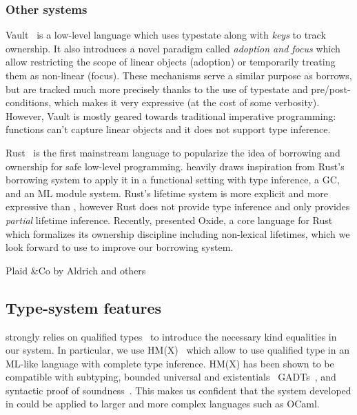 \subsubsection{Other systems}

Vault~\citep{DBLP:conf/pldi/DeLineF01}
is a low-level language which uses typestate along with \emph{keys}
to track ownership. It also introduces a novel paradigm
called \emph{adoption and focus} \citep{DBLP:conf/pldi/FahndrichD02}
which allow restricting the scope of linear objects
(adoption) or temporarily treating them as non-linear (focus).
These mechanisms serve a similar purpose as borrows, but are tracked
much more precisely thanks to the use of typestate and pre/post-conditions,
which makes it very expressive (at the cost of some verbosity).
However, Vault is mostly geared towards traditional imperative programming:
functions can't capture linear objects and it does not support
type inference.

Rust~\citep{rust} is the first
mainstream language to popularize the idea of borrowing and ownership
for safe low-level programming.
\lang heavily draws inspiration from Rust's borrowing system to apply
it in a functional setting with type inference, a GC, and
an ML module system.
Rust's lifetime system is more explicit and more expressive than \lang,
however Rust does not provide type inference
and only provides \emph{partial} lifetime inference.
Recently, \citet{DBLP:journals/corr/abs-1903-00982} presented Oxide,
a core language for Rust which formalizes its ownership discipline
including non-lexical lifetimes, which we look forward to use to improve
our borrowing system.

Plaid \&Co by Aldrich and others

\subsection{Type-system features}

\lang strongly relies on qualified types~\cite{DBLP:journals/scp/Jones94}
to introduce the necessary kind equalities in our system. In
particular, we use HM(X)~\citep{DBLP:journals/tapos/OderskySW99} which
allow to use qualified type in an ML-like language with complete
type inference.
HM(X) has been shown to be compatible with subtyping,
bounded universal and existentials~\citep{DBLP:conf/icfp/Simonet03}
GADTs~\citep{DBLP:journals/toplas/SimonetP07},
and syntactic proof of soundness~\citep{DBLP:journals/entcs/SkalkaP02}.
This makes us confident that the system developed in \lang
could be applied to larger and more complex languages such as OCaml.

